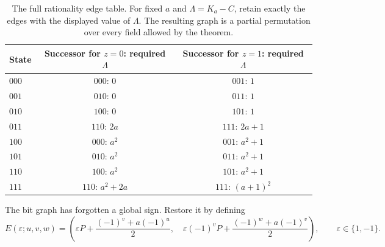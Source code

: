 \begin{table}[htbp]
\centering
\begin{tabular}{@{}lcc@{}}
\toprule
State & Successor for $z=0$: required $\Lambda$
      & Successor for $z=1$: required $\Lambda$\\
\midrule
$000$ & $000$: $0$ & $001$: $1$\\
$001$ & $010$: $0$ & $011$: $1$\\
$010$ & $100$: $0$ & $101$: $1$\\
$011$ & $110$: $2a$ & $111$: $2a+1$\\
$100$ & $000$: $a^2$ & $001$: $a^2+1$\\
$101$ & $010$: $a^2$ & $011$: $a^2+1$\\
$110$ & $100$: $a^2$ & $101$: $a^2+1$\\
$111$ & $110$: $a^2+2a$ & $111$: $(a+1)^2$\\
\bottomrule
\end{tabular}
\caption{The full rationality edge table. For fixed $a$ and
$\Lambda=K_a-C$, retain exactly the edges with the displayed value
of $\Lambda$. The resulting graph is a partial permutation over
every field allowed by the theorem.}
\label{tab:edges}
\end{table}

The bit graph has forgotten a global sign. Restore it by defining
\begin{equation}\label{eq:label}
 E(\varepsilon;u,v,w)=
 \left(\varepsilon P+\frac{(-1)^v+a(-1)^u}{2},\quad
 \varepsilon(-1)^vP+\frac{(-1)^w+a(-1)^v}{2}\right),
 \qquad \varepsilon\in\{1,-1\}.
\end{equation}

